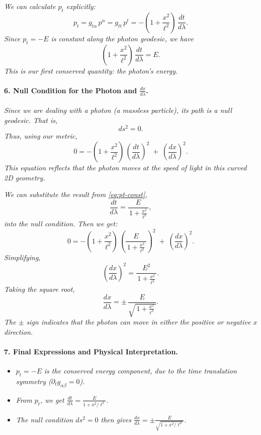 \textit{We can calculate \(p_t\) explicitly:}
\[
p_t
= g_{t\alpha}\,p^\alpha
= g_{tt}\,p^t
= -\left(1 + \frac{x^2}{\ell^2}\right)\,\frac{dt}{d\lambda}.
\]
\textit{Since \(p_t = -E\) is constant along the photon geodesic, we have}
\begin{equation}\label{eq:pt-const}
\left(1 + \frac{x^2}{\ell^2}\right)\,\frac{dt}{d\lambda} = E.
\end{equation}
\textit{This is our first conserved quantity: the photon's energy.}

\paragraph{6. Null Condition for the Photon and \(\frac{dx}{d\lambda}\).}

\textit{Since we are dealing with a photon (a massless particle), its path is a \emph{null} geodesic. That is,}
\[
ds^2 = 0.
\]
\textit{Thus, using our metric,}
\begin{equation}
0
= -\left(1 + \frac{x^2}{\ell^2}\right)\,\left(\frac{dt}{d\lambda}\right)^2
\;+\;
\left(\frac{dx}{d\lambda}\right)^2.
\end{equation}
\textit{This equation reflects that the photon moves at the speed of light in this curved 2D geometry.}

\textit{We can substitute the result from \eqref{eq:pt-const},}
\[
\frac{dt}{d\lambda}
= \frac{E}{\,1 + \frac{x^2}{\ell^2}\,},
\]
\textit{into the null condition. Then we get:}
\[
0
= -\left(1 + \frac{x^2}{\ell^2}\right)\,
 \left(\frac{E}{\,1 + \frac{x^2}{\ell^2}\,}\right)^2
\;+\;
\left(\frac{dx}{d\lambda}\right)^2.
\]
\textit{Simplifying,}
\[
\left(\frac{dx}{d\lambda}\right)^2
= \frac{E^2}{\,1 + \frac{x^2}{\ell^2}\,}.
\]
\textit{Taking the square root,}
\begin{equation}
\frac{dx}{d\lambda}
= \pm\,\frac{E}{\sqrt{\,1 + \frac{x^2}{\ell^2}\,}}.
\end{equation}
\textit{The \(\pm\) sign indicates that the photon can move in either the positive or negative \(x\) direction.}

\paragraph{7. Final Expressions and Physical Interpretation.}

\begin{itemize}
\item \(\displaystyle p_t = -E\) \textit{is the \emph{conserved} energy component, due to the time translation symmetry (\(\partial_t g_{\alpha\beta} = 0\)).}
\item \textit{From \(p_t\), we get \(\displaystyle \frac{dt}{d\lambda} = \frac{E}{1 + x^2/\ell^2}\).}
\item \textit{The null condition \(ds^2 = 0\) then gives \(\displaystyle \frac{dx}{d\lambda} = \pm \frac{E}{\sqrt{1 + x^2/\ell^2}}\). }
\end{itemize}

